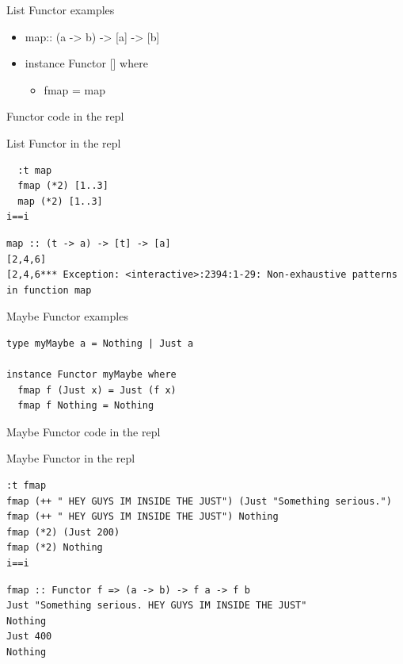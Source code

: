 \documentclass[presetation]{beamer}
\begin{document}
\begin{frame}[label={sec:org7e2fb16}]{List Functor examples}
\begin{example}
\begin{itemize}
\item map:: (a -> b)  -> [a] -> [b]
\item instance Functor [] where
\begin{itemize}
\item fmap = map
\end{itemize}
\end{itemize}
\end{example}
\end{frame}


\begin{frame}[fragile,label={sec:orgeb6728d}]{Functor code in the repl}
 \begin{block}{List Functor in the repl}
\begin{verbatim}
  :t map
  fmap (*2) [1..3]
  map (*2) [1..3]
i==i
\end{verbatim}

\begin{verbatim}
map :: (t -> a) -> [t] -> [a]
[2,4,6]
[2,4,6*** Exception: <interactive>:2394:1-29: Non-exhaustive patterns in function map
\end{verbatim}
\end{block}
\end{frame}

\begin{frame}[fragile,label={sec:org29871be}]{Maybe Functor examples}
 \begin{example}
\begin{verbatim}
type myMaybe a = Nothing | Just a 

instance Functor myMaybe where
  fmap f (Just x) = Just (f x)
  fmap f Nothing = Nothing
\end{verbatim}
\end{example}
\end{frame}
\begin{frame}[fragile,label={sec:org150e448}]{Maybe Functor code in the repl}
 \begin{block}{Maybe Functor in the repl}
\begin{verbatim}
:t fmap
fmap (++ " HEY GUYS IM INSIDE THE JUST") (Just "Something serious.")
fmap (++ " HEY GUYS IM INSIDE THE JUST") Nothing
fmap (*2) (Just 200)
fmap (*2) Nothing
i==i
\end{verbatim}

\begin{verbatim}
fmap :: Functor f => (a -> b) -> f a -> f b
Just "Something serious. HEY GUYS IM INSIDE THE JUST"
Nothing
Just 400
Nothing
\end{verbatim}
\end{block}
\end{frame}
\end{document}
